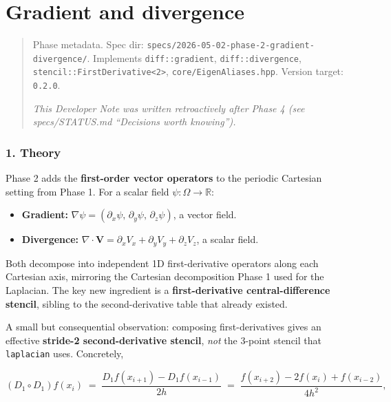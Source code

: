 \chapter{Gradient and divergence}
\label{chap:dev:gradient-and-divergence}

\begin{quote}
Phase metadata. Spec dir:
\passthrough{\lstinline!specs/2026-05-02-phase-2-gradient-divergence/!}.
Implements \passthrough{\lstinline!diff::gradient!},
\passthrough{\lstinline!diff::divergence!},
\passthrough{\lstinline!stencil::FirstDerivative<2>!},
\passthrough{\lstinline!core/EigenAliases.hpp!}. Version target:
\passthrough{\lstinline!0.2.0!}.

\emph{This Developer Note was written retroactively after Phase 4 (see
specs/STATUS.md ``Decisions worth knowing'').}
\end{quote}

\subsection{1. Theory}\label{theory}

Phase 2 adds the \textbf{first-order vector operators} to the periodic
Cartesian setting from Phase 1. For a scalar field
\(\psi : \Omega \to \mathbb{R}\):

\begin{itemize}
\tightlist
\item
  \textbf{Gradient:}
  \(\nabla\psi = (\partial_x \psi,\, \partial_y \psi,\, \partial_z \psi)\),
  a vector field.
\item
  \textbf{Divergence:}
  \(\nabla \cdot \mathbf{V} = \partial_x V_x + \partial_y V_y + \partial_z V_z\),
  a scalar field.
\end{itemize}

Both decompose into independent 1D first-derivative operators along each
Cartesian axis, mirroring the Cartesian decomposition Phase 1 used for
the Laplacian. The key new ingredient is a \textbf{first-derivative
central-difference stencil}, sibling to the second-derivative table that
already existed.

A small but consequential observation: composing first-derivatives gives
an effective \textbf{stride-2 second-derivative stencil}, \emph{not} the
3-point stencil that \passthrough{\lstinline!laplacian!} uses.
Concretely,

\[
(D_1 \circ D_1)f(x_i) \;=\; \frac{D_1 f(x_{i+1}) - D_1 f(x_{i-1})}{2h} \;=\; \frac{f(x_{i+2}) - 2 f(x_i) + f(x_{i-2})}{4 h^2},
\]

